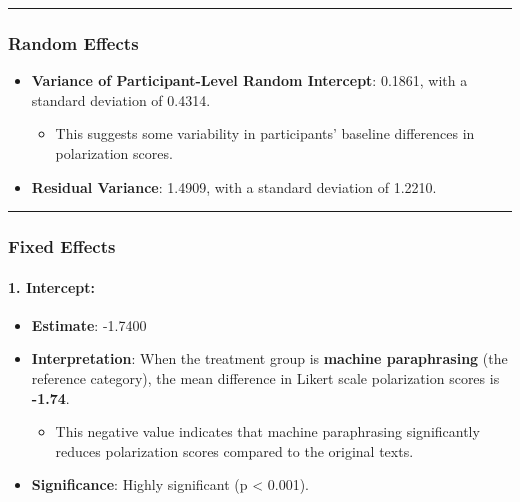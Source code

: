 \documentclass[
]{article}
\providecommand{\tightlist}{%
  \setlength{\itemsep}{0pt}\setlength{\parskip}{0pt}}
\begin{document}
\begin{center}\rule{0.5\linewidth}{0.5pt}\end{center}

\subsubsection{\texorpdfstring{\textbf{Random
Effects}}{Random Effects}}\label{random-effects-3}

\begin{itemize}
\tightlist
\item
  \textbf{Variance of Participant-Level Random Intercept}: 0.1861, with
  a standard deviation of 0.4314.

  \begin{itemize}
  \tightlist
  \item
    This suggests some variability in participants' baseline differences
    in polarization scores.
  \end{itemize}
\item
  \textbf{Residual Variance}: 1.4909, with a standard deviation of
  1.2210.
\end{itemize}

\begin{center}\rule{0.5\linewidth}{0.5pt}\end{center}

\subsubsection{\texorpdfstring{\textbf{Fixed
Effects}}{Fixed Effects}}\label{fixed-effects-3}

\paragraph{\texorpdfstring{\textbf{1.
Intercept:}}{1. Intercept:}}\label{intercept-3}

\begin{itemize}
\tightlist
\item
  \textbf{Estimate}: -1.7400
\item
  \textbf{Interpretation}: When the treatment group is \textbf{machine
  paraphrasing} (the reference category), the mean difference in Likert
  scale polarization scores is \textbf{-1.74}.

  \begin{itemize}
  \tightlist
  \item
    This negative value indicates that machine paraphrasing
    significantly reduces polarization scores compared to the original
    texts.
  \end{itemize}
\item
  \textbf{Significance}: Highly significant (p \textless{} 0.001).
\end{itemize}
\end{document}

